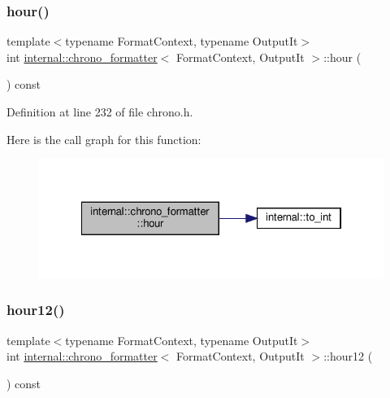 \subsubsection{\texorpdfstring{hour()}{hour()}}
{\footnotesize\ttfamily template$<$typename Format\+Context, typename Output\+It$>$ \\
int \hyperlink{structinternal_1_1chrono__formatter}{internal\+::chrono\+\_\+formatter}$<$ Format\+Context, Output\+It $>$\+::hour (\begin{DoxyParamCaption}{ }\end{DoxyParamCaption}) const\hspace{0.3cm}{\ttfamily [inline]}}



Definition at line 232 of file chrono.\+h.

Here is the call graph for this function\+:
\nopagebreak
\begin{figure}[H]
\begin{center}
\leavevmode
\includegraphics[width=322pt]{structinternal_1_1chrono__formatter_a91d13ec0f969481e287c6e813b28bd6d_cgraph}
\end{center}
\end{figure}
\mbox{\label{structinternal_1_1chrono__formatter_a93a043750e6942332112e7210c517804}} 
\subsubsection{\texorpdfstring{hour12()}{hour12()}}
{\footnotesize\ttfamily template$<$typename Format\+Context, typename Output\+It$>$ \\
int \hyperlink{structinternal_1_1chrono__formatter}{internal\+::chrono\+\_\+formatter}$<$ Format\+Context, Output\+It $>$\+::hour12 (\begin{DoxyParamCaption}{ }\end{DoxyParamCaption}) const\hspace{0.3cm}{\ttfamily [inline]}}



